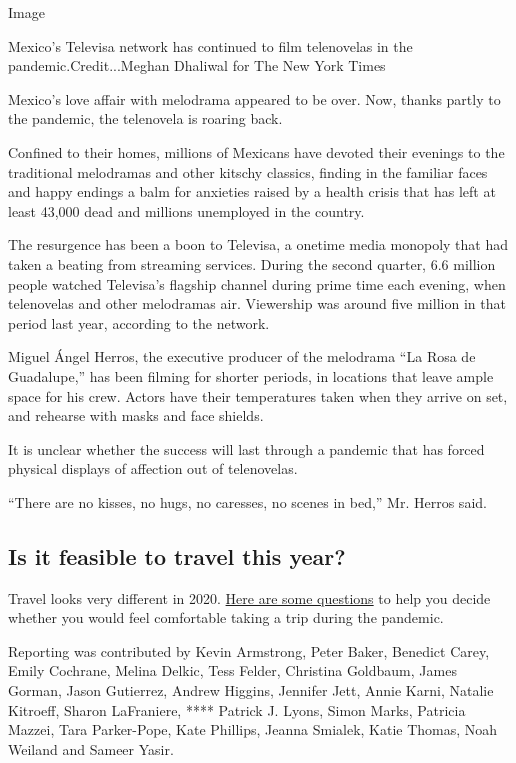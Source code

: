 Image

Mexico's Televisa network has continued to film telenovelas in the
pandemic.Credit...Meghan Dhaliwal for The New York Times

Mexico's love affair with melodrama appeared to be over. Now, thanks
partly to the pandemic, the telenovela is roaring back.

Confined to their homes, millions of Mexicans have devoted their
evenings to the traditional melodramas and other kitschy classics,
finding in the familiar faces and happy endings a balm for anxieties
raised by a health crisis that has left at least 43,000 dead and
millions unemployed in the country.

The resurgence has been a boon to Televisa, a onetime media monopoly
that had taken a beating from streaming services. During the second
quarter, 6.6 million people watched Televisa's flagship channel during
prime time each evening, when telenovelas and other melodramas air.
Viewership was around five million in that period last year, according
to the network.

Miguel Ángel Herros, the executive producer of the melodrama ``La Rosa
de Guadalupe,'' has been filming for shorter periods, in locations that
leave ample space for his crew. Actors have their temperatures taken
when they arrive on set, and rehearse with masks and face shields.

It is unclear whether the success will last through a pandemic that has
forced physical displays of affection out of telenovelas.

``There are no kisses, no hugs, no caresses, no scenes in bed,'' Mr.
Herros said.

\hypertarget{is-it-feasible-to-travel-this-year}{%
\subsection{Is it feasible to travel this
year?}\label{is-it-feasible-to-travel-this-year}}

Travel looks very different in 2020.
\href{https://www.nytimes.com/interactive/2020/07/31/travel/coronavirus-travel-risk.html}{Here
are some questions} to help you decide whether you would feel
comfortable taking a trip during the pandemic.

Reporting was contributed by Kevin Armstrong, Peter Baker, Benedict
Carey, Emily Cochrane, Melina Delkic, Tess Felder, Christina Goldbaum,
James Gorman, Jason Gutierrez, Andrew Higgins, Jennifer Jett, Annie
Karni, Natalie Kitroeff, Sharon LaFraniere, **** Patrick J. Lyons, Simon
Marks, Patricia Mazzei, Tara Parker-Pope, Kate Phillips, Jeanna Smialek,
Katie Thomas, Noah Weiland and Sameer Yasir.

